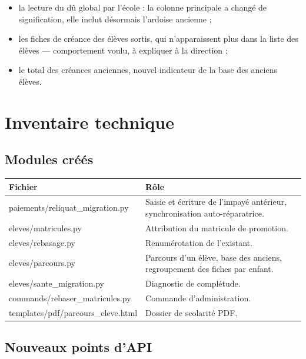 \documentclass[11pt,a4paper]{report}
\begin{document}
\begin{itemize}
\item la lecture du dû global par l'école : la colonne principale a changé de
      signification, elle inclut désormais l'ardoise ancienne ;
\item les fiches de créance des élèves sortis, qui n'apparaissent plus dans la
      liste des élèves --- comportement voulu, à expliquer à la direction ;
\item le total des créances anciennes, nouvel indicateur de la base des
      anciens élèves.
\end{itemize}

\appendix
\chapter{Inventaire technique}

\section{Modules créés}

\begin{center}
\begin{tabularx}{\linewidth}{@{}>{\small\ttfamily}p{6.2cm}X@{}}
\toprule
\textbf{Fichier} & \textbf{Rôle} \\
\midrule
paiements/reliquat\_migration.py & Saisie et écriture de l'impayé
  antérieur, synchronisation auto-réparatrice. \\
eleves/matricules.py & Attribution du matricule de promotion. \\
eleves/rebasage.py & Renumérotation de l'existant. \\
eleves/parcours.py & Parcours d'un élève, base des anciens,
  regroupement des fiches par enfant. \\
eleves/sante\_migration.py & Diagnostic de complétude. \\
commands/rebaser\_matricules.py & Commande d'administration. \\
templates/pdf/parcours\_eleve.html & Dossier de scolarité PDF. \\
\bottomrule
\end{tabularx}
\end{center}

\section{Nouveaux points d'API}
\end{document}
